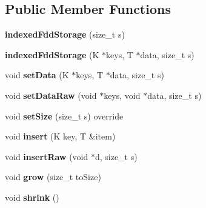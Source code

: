 \subsection*{Public Member Functions}
\begin{DoxyCompactItemize}
\item 
\hypertarget{classfaster_1_1indexedFddStorage_ae23d28156db0adaf7ce85d59f3de83b8}{}\label{classfaster_1_1indexedFddStorage_ae23d28156db0adaf7ce85d59f3de83b8} 
{\bfseries indexed\+Fdd\+Storage} (size\+\_\+t s)
\item 
\hypertarget{classfaster_1_1indexedFddStorage_a0d632c3336dc752458bb9262c67f4c9a}{}\label{classfaster_1_1indexedFddStorage_a0d632c3336dc752458bb9262c67f4c9a} 
{\bfseries indexed\+Fdd\+Storage} (K $\ast$keys, T $\ast$data, size\+\_\+t s)
\item 
\hypertarget{classfaster_1_1indexedFddStorage_ae7c5b6ad85c386d8cffd904cb572d488}{}\label{classfaster_1_1indexedFddStorage_ae7c5b6ad85c386d8cffd904cb572d488} 
void {\bfseries set\+Data} (K $\ast$keys, T $\ast$data, size\+\_\+t s)
\item 
\hypertarget{classfaster_1_1indexedFddStorage_a9da343629ac1b2c725e4683177a3278b}{}\label{classfaster_1_1indexedFddStorage_a9da343629ac1b2c725e4683177a3278b} 
void {\bfseries set\+Data\+Raw} (void $\ast$keys, void $\ast$data, size\+\_\+t s)
\item 
\hypertarget{classfaster_1_1indexedFddStorage_a80f2ff6bb9c7b5a5cc04f22e4395596d}{}\label{classfaster_1_1indexedFddStorage_a80f2ff6bb9c7b5a5cc04f22e4395596d} 
void {\bfseries set\+Size} (size\+\_\+t s) override
\item 
\hypertarget{classfaster_1_1indexedFddStorage_a0a9fc58cdf64a108b43c1e4ec2d3a557}{}\label{classfaster_1_1indexedFddStorage_a0a9fc58cdf64a108b43c1e4ec2d3a557} 
void {\bfseries insert} (K key, T \&item)
\item 
\hypertarget{classfaster_1_1indexedFddStorage_a4e5ac4c4f6d1e32f5949361a54a29453}{}\label{classfaster_1_1indexedFddStorage_a4e5ac4c4f6d1e32f5949361a54a29453} 
void {\bfseries insert\+Raw} (void $\ast$d, size\+\_\+t s)
\item 
\hypertarget{classfaster_1_1indexedFddStorage_ad4430e7b86d905f3df6a10ee72d9de3d}{}\label{classfaster_1_1indexedFddStorage_ad4430e7b86d905f3df6a10ee72d9de3d} 
void {\bfseries grow} (size\+\_\+t to\+Size)
\item 
\hypertarget{classfaster_1_1indexedFddStorage_a8c235374da0dc7291a062abf2dd0b390}{}\label{classfaster_1_1indexedFddStorage_a8c235374da0dc7291a062abf2dd0b390} 
void {\bfseries shrink} ()
\end{DoxyCompactItemize}
